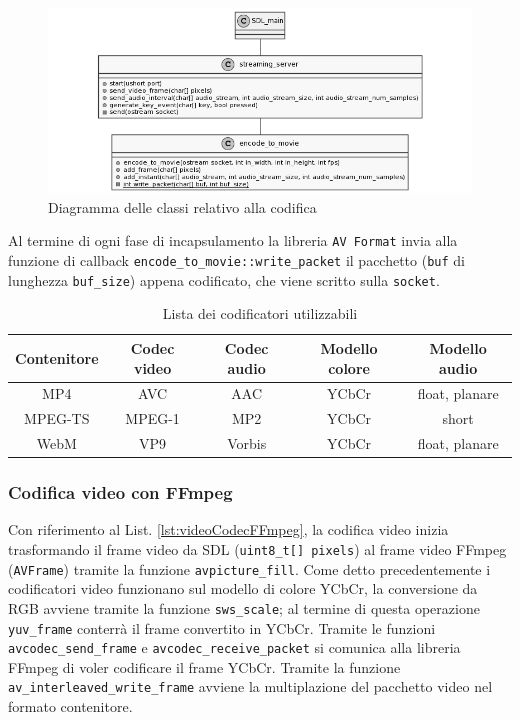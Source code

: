 \begin{figure}[H]
	\includegraphics[width=\linewidth]{immagini/class_server_and_encoding}
	\caption{Diagramma delle classi relativo alla codifica}
	\label{fig:class_server_and_encoding}
\end{figure}

Al termine di ogni fase di incapsulamento la libreria \verb|AV Format| invia alla funzione di callback \verb|encode_to_movie::write_packet| il pacchetto (\verb|buf| di lunghezza \verb|buf_size|) appena codificato, che viene scritto sulla \verb|socket|. 

\begin{table}[H]
	\centering
	\begin{tabular}{||c c c c c||} 
		\hline
		Contenitore & Codec video & Codec audio & Modello colore & Modello audio \\
		\hline\hline
		MP4 & AVC & AAC & YCbCr & float, planare \\
		\hline
		MPEG-TS & MPEG-1 & MP2 & YCbCr & short \\
		\hline
		WebM & VP9 & Vorbis & YCbCr & float, planare \\
		\hline
	\end{tabular}

	\caption{Lista dei codificatori utilizzabili}
	\label{table:PossibiliCodifiche}
\end{table}



\subsubsection{Codifica video con FFmpeg}
Con riferimento al List. \ref{lst:videoCodecFFmpeg}, la codifica video inizia trasformando il frame video da SDL (\verb|uint8_t[] pixels|) al frame video FFmpeg (\verb|AVFrame|) tramite la funzione \verb|avpicture_fill|. Come detto precedentemente i codificatori video funzionano sul modello di colore YCbCr, la conversione da RGB avviene tramite la funzione \verb|sws_scale|; al termine di questa operazione \verb|yuv_frame| conterrà il frame convertito in YCbCr. Tramite le funzioni \verb|avcodec_send_frame| e \verb|avcodec_receive_packet| si comunica alla libreria FFmpeg di voler codificare il frame YCbCr. Tramite la funzione \verb|av_interleaved_write_frame| avviene la multiplazione del pacchetto video nel formato contenitore.

